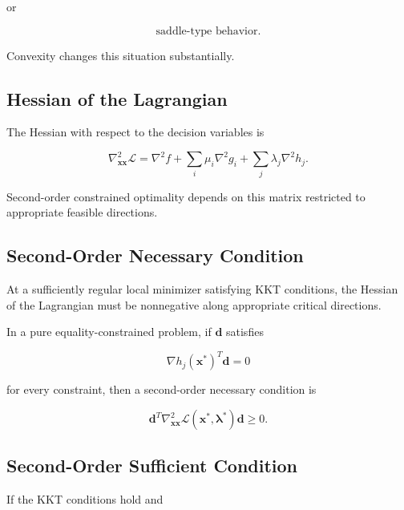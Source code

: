 or

\[
\boxed{
\text{saddle-type behavior}.
}
\]

Convexity changes this situation substantially.

\subsection{Hessian of the Lagrangian}
\label{subsec:hessian-of-lagrangian}

The Hessian with respect to the decision variables is

\[
\boxed{
\nabla_{\mathbf{x}\mathbf{x}}^2
\mathcal{L}
=
\nabla^2f
+
\sum_i
\mu_i
\nabla^2g_i
+
\sum_j
\lambda_j
\nabla^2h_j.
}
\]

Second-order constrained optimality depends on this matrix restricted to
appropriate feasible directions.

\subsection{Second-Order Necessary Condition}
\label{subsec:nlp-second-order-necessary}

At a sufficiently regular local minimizer satisfying KKT conditions, the
Hessian of the Lagrangian must be nonnegative along appropriate critical
directions.

In a pure equality-constrained problem, if \(\mathbf{d}\) satisfies

\[
\boxed{
\nabla h_j(\mathbf{x}^*)^T\mathbf{d}=0
}
\]

for every constraint, then a second-order necessary condition is

\[
\boxed{
\mathbf{d}^T
\nabla_{\mathbf{x}\mathbf{x}}^2
\mathcal{L}
(\mathbf{x}^*,\boldsymbol{\lambda}^*)
\mathbf{d}
\geq0.
}
\]

\subsection{Second-Order Sufficient Condition}
\label{subsec:nlp-second-order-sufficient}

If the KKT conditions hold and

